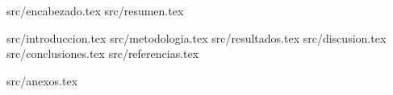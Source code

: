 \documentclass[10pt]{article}
\begin{document}
 {src/encabezado.tex}
 {src/resumen.tex}
\begin{multicols}{2}
   {src/introduccion.tex}
   {src/metodologia.tex}
   {src/resultados.tex}
   {src/discusion.tex}
   {src/conclusiones.tex}
   {src/referencias.tex}
\end{multicols}
 {src/anexos.tex}
\end{document}
